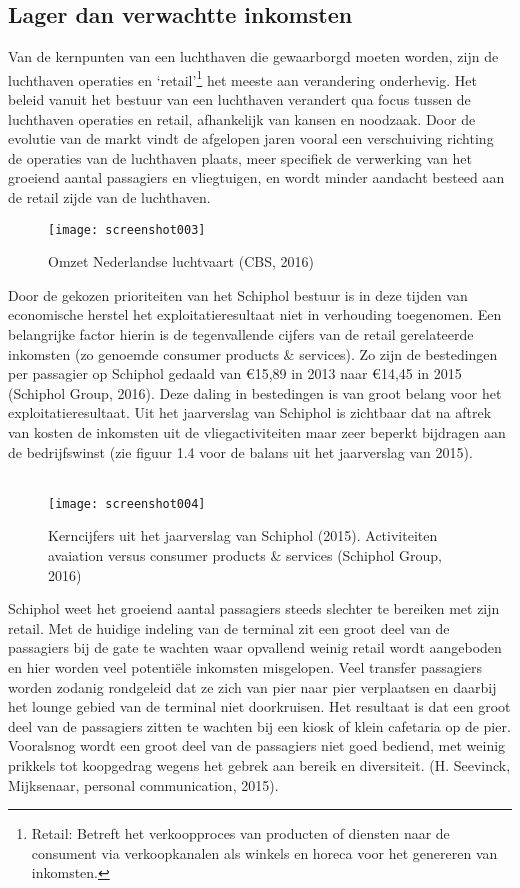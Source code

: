 \subsection{Lager dan verwachtte inkomsten}
Van de kernpunten van een luchthaven die gewaarborgd moeten worden, zijn de luchthaven operaties en ‘retail’\footnote{Retail: Betreft het verkoopproces van producten of diensten naar de consument via verkoopkanalen als winkels en horeca voor het genereren van inkomsten.}  het meeste aan verandering onderhevig. Het beleid vanuit het bestuur van een luchthaven verandert qua focus tussen de luchthaven operaties en retail, afhankelijk van kansen en noodzaak. Door de evolutie van de markt vindt de afgelopen jaren vooral een verschuiving richting de operaties van de luchthaven plaats, meer specifiek de verwerking van het groeiend aantal passagiers en vliegtuigen, en wordt minder aandacht besteed aan de retail zijde van de luchthaven.
\begin{figure}[h]
	\centering
	\texttt{[image: screenshot003]}
	\caption{Omzet Nederlandse luchtvaart (CBS, 2016)}
	\label{fig:screenshot003}
\end{figure}
Door de gekozen prioriteiten van het Schiphol bestuur is in deze tijden van economische herstel het exploitatieresultaat niet in verhouding toegenomen. Een belangrijke factor hierin is de tegenvallende cijfers van de retail gerelateerde inkomsten (zo genoemde consumer products \& services). Zo zijn de bestedingen per passagier op Schiphol gedaald van €15,89 in 2013 naar €14,45 in 2015 (Schiphol Group, 2016). Deze daling in bestedingen is van groot belang voor het exploitatieresultaat. Uit het jaarverslag van Schiphol is zichtbaar dat na aftrek van kosten de inkomsten uit de vliegactiviteiten maar zeer beperkt bijdragen aan de bedrijfswinst (zie figuur 1.4 voor de balans uit het jaarverslag van 2015).
\\ \\
\begin{figure}[h]
	\centering
	\texttt{[image: screenshot004]}
	\caption{Kerncijfers uit het jaarverslag van Schiphol (2015). Activiteiten avaiation versus consumer products \& services (Schiphol Group, 2016)}
	\label{fig:screenshot004}
\end{figure}
Schiphol weet het groeiend aantal passagiers steeds slechter te bereiken met zijn retail. Met de huidige indeling van de terminal zit een groot deel van de passagiers bij de gate te wachten waar opvallend weinig retail wordt aangeboden en hier worden veel potentiële inkomsten misgelopen. Veel transfer passagiers worden zodanig rondgeleid dat ze zich van pier naar pier verplaatsen en daarbij het lounge gebied van de terminal niet doorkruisen. Het resultaat is dat een groot deel van de passagiers zitten te wachten bij een kiosk of klein cafetaria op de pier. Vooralsnog wordt een groot deel van de passagiers niet goed bediend, met weinig prikkels tot koopgedrag wegens het gebrek aan bereik en diversiteit. (H. Seevinck, Mijksenaar, personal communication, 2015).
\pagebreak
